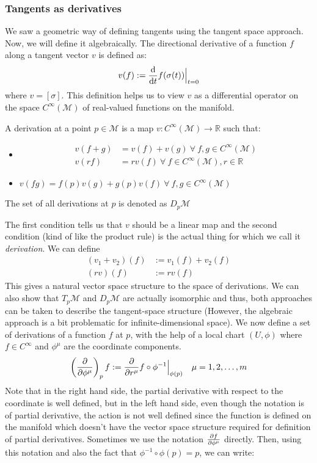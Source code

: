 \subsubsection{Tangents as derivatives}
We saw a geometric way of defining tangents using the tangent space approach. Now, we will define it algebraically. The directional derivative of a function $f$ along a tangent  vector $v$ is defined as:
$$v(f) := \dv{t}f(\sigma(t))\Big|_{t=0}$$
where $v = [\sigma]$. This definition helps us to view $v$ as a differential operator on the space $C^\infty(\mathcal{M})$ of real-valued functions on the manifold. 
\begin{definition}[Derivations]
  A derivation at a point $p\in\mathcal{M}$ is a map $v:C^\infty(\mathcal{M})\rightarrow \mathbb{R}$ such that:
  \begin{itemize}
    \item 
    \begin{align*}
      v(f+g) &= v(f) + v(g) \ \forall \ f,g\in C^\infty(\mathcal{M})\\
      v(rf) &= r v(f) \ \forall \ f \in C^\infty(\mathcal{M}), r \in \mathbb{R}
    \end{align*}
    \item $v(fg) = f(p)v(g)+ g(p)v(f)\ \forall \ f,g\in C^\infty(\mathcal{M})$
  \end{itemize}
  The set of all derivations at $p$ is denoted as $D_p\mathcal{M}$
\end{definition}
The first condition tells us that $v$ should be a linear map and the second condition (kind of like the product rule) is the actual thing for which we call it \textit{derivation}. We can define
\begin{align*}
  (v_1+v_2)(f) &:=v_1(f)+v_2(f)\\
(rv)(f) &:= rv(f)
\end{align*}
This gives a natural vector space structure to the space of derivations. We can also show that $T_p\mathcal{M}$ and $D_p\mathcal{M}$ are actually isomorphic and thus, both approaches can be taken to describe the tangent-space structure (However, the algebraic approach is a bit problematic for infinite-dimensional space). 
We now define a set of derivations of a function $f$ at $p$, with the help of a local chart $(U,\phi)$ where $f\in C^\infty$ and $\phi^\mu$ are the coordinate components.
$$\left( \pdv{\phi^\mu} \right)_p f := \pdv{r^\mu}f\circ \phi^{-1}\Big|_{\phi(p)}\quad \mu = 1,2,\ldots, m$$
Note that in the right hand side, the partial derivative with respect to the coordinate is well defined, but in the left hand side, even though the notation is of partial derivative, the action is not well defined since the function is defined on the manifold which doesn't have the vector space structure required for definition of partial derivatives. Sometimes we use the notation $\pdv{f}{\phi^\mu}$ directly. Then, using this notation and also the fact that $\phi^{-1}\circ \phi(p) = p$, we can write:

